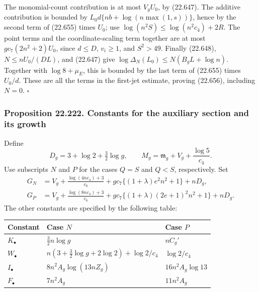 \documentclass[
  11pt,
  a4paper,
]{article}
\newcounter{none} %
\begin{document}
The monomial-count contribution is at most \(V_gU_0\), by (22.647). The
additive contribution is bounded by \(L_0d\{nb+\log(n\max(1,s))\}\),
hence by the second term of (22.655) times \(U_0\); use
\(\log(n^2S)\le\log(n^2c_4)+2R\). The point terms and the
coordinate-scaling term together are at most \(g c_7(2n^2+2)U_0\), since
\(d\le D\), \(v_i\ge1\), and \(S^2>49\). Finally (22.648),
\(N\le nU_0/(DL)\), and (22.647) give
\(\log\Delta_N(L_0)\le N(B_gL+\log n)\). Together with \(\log8+\mu_E\),
this is bounded by the last term of (22.655) times \(U_0/d\). These are
all the terms in the first-jet estimate, proving (22.656), including
\(N=0\). \(\square\)

\subsubsection{Proposition 22.222. Constants for the auxiliary section
and its
growth}\label{proposition-22.222.-constants-for-the-auxiliary-section-and-its-growth}

Define \[
 D_g=3+\log2+\tfrac32\log g,
 \qquad M_g=\mathfrak m_g+V_g+\frac{\log5}{c_4}.
 \tag{22.657}
\] Use subscripts \(N\) and \(P\) for the cases \(Q=S\) and \(Q<S\),
respectively. Set \[
 \begin{split}
 G_N&=V_g+\frac{\log(4nc_4)+3}{c_6}
       +g c_7\{(1+\lambda)e^2n^2+1\}+nD_g,\\
 G_P&=V_g+\frac{\log(8nc_4)+3}{c_6}
       +g c_7\{(1+\lambda)(2e+1)^2n^2+1\}+nD_g.
 \end{split}
 \tag{22.658}
\] The other constants are specified by the following table:

{\def\LTcaptype{none} %
\begin{longtable}[]{@{}
  >{\raggedright\arraybackslash}p{}
  >{\raggedleft\arraybackslash}p{}
  >{\raggedleft\arraybackslash}p{}@{}}
\toprule\noalign{}
\begin{minipage}[b]{\linewidth}\raggedright
Constant
\end{minipage} & \begin{minipage}[b]{\linewidth}\raggedleft
Case \(N\)
\end{minipage} & \begin{minipage}[b]{\linewidth}\raggedleft
Case \(P\)
\end{minipage} \\
\midrule\noalign{}
\endhead
\bottomrule\noalign{}
\endlastfoot
\(K_\bullet\) & \(\tfrac32n\log g\) & \(nC_g'\) \\
\(W_\bullet\) & \(n(3+\tfrac32\log g+2\log2)+\log2/c_4\) &
\(\log2/c_4\) \\
\(I_\bullet\) & \(8n^2A_g\log(13nZ_g)\) & \(16n^2A_g\log13\) \\
\(F_\bullet\) & \(7n^2A_g\) & \(11n^2A_g\) \\
\end{longtable}
}
\end{document}

